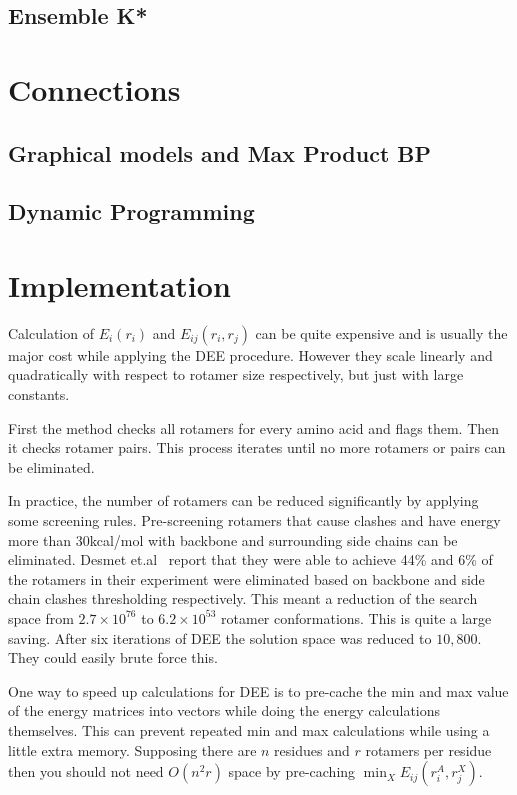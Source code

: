 \documentclass{article}
\begin{document}
\subsection{Ensemble K*}

\section{Connections}
\subsection{Graphical models and Max Product BP}

\subsection{Dynamic Programming}


\section{Implementation}
Calculation  of $E_i(r_i)$ and $E_{ij}(r_i,r_j)$ can be quite expensive and is usually the major cost while applying the DEE procedure. However they scale linearly and quadratically with respect to rotamer size respectively, but just with large constants. 

First the method checks all rotamers for every amino acid and flags them. Then it checks rotamer pairs. This process iterates until no more rotamers or pairs can be eliminated. 

In practice, the number of rotamers can be reduced significantly by applying some screening rules. Pre-screening rotamers that cause clashes and have energy more than 30kcal/mol with backbone and surrounding side chains can be eliminated. Desmet et.al~\cite{Desmet1992} report  that they were able to achieve 44\% and 6\% of the rotamers in their experiment were eliminated based on backbone and side chain clashes thresholding respectively. This meant a reduction of the search space from $2.7\times10^{76}$ to $6.2\times10^{53}$ rotamer conformations. This is quite a large saving. After six iterations of DEE the solution space was reduced to $10,800$. They could easily brute force this. 

One way to speed up calculations for DEE is to pre-cache the min and max value of the energy matrices into vectors while doing the energy calculations themselves. This can prevent repeated min and max calculations while using a little extra memory. Supposing there are $n$ residues and $r$ rotamers per residue then you should not need $O(n^2r)$ space by pre-caching $\min_X E_{ij}(r_i^A,r_j^X)$.
\end{document}
